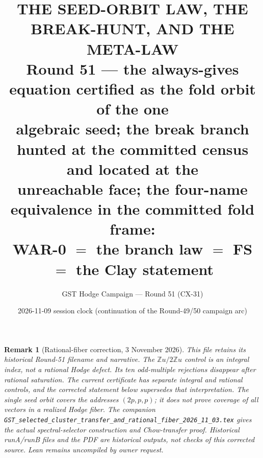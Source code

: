 \documentclass[11pt]{article}
\title{\bf THE SEED-ORBIT LAW, THE BREAK-HUNT, AND THE META-LAW\\ \large Round 51 --- the always-gives equation certified as the fold orbit of the one\\ algebraic seed; the break branch hunted at the committed census and located at the\\ unreachable face; the four-name equivalence in the committed fold frame:\\ WAR-0 $=$ the branch law $=$ FS $=$ the Clay statement}
\author{GST Hodge Campaign --- Round 51 (CX-31)}
\date{2026-11-09 session clock (continuation of the Round-49/50 campaign arc)}
\newtheorem{remark}[theorem]{Remark}
\begin{document}
\maketitle
\begin{remark}[Rational-fiber correction, 3 November 2026]
This file retains its historical Round-51 filename and narrative. The
$\mathbb Zu/2\mathbb Zu$ control is an integral index, not a rational
Hodge defect. Its ten odd-multiple rejections disappear after rational
saturation. The current certificate has separate integral and rational
controls, and the corrected statement below supersedes that interpretation.
The single seed orbit covers the addresses $(2p,p,p)$; it does not prove
coverage of all vectors in a realized Hodge fiber. The companion
\texttt{GST\_selected\_cluster\_transfer\_and\_rational\_fiber\_2026\_11\_03.tex}
gives the actual spectral-selector construction and Chow-transfer proof.
Historical runA/runB files and the PDF are historical outputs, not checks
of this corrected source. Lean remains uncompiled by owner request.
\end{remark}
\end{document}
